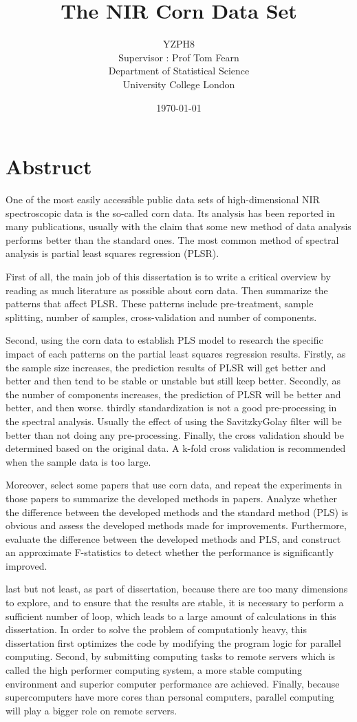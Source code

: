\documentclass[a4paper,12pt,titlepage]{article} %
\title{The NIR Corn Data Set}
\author{YZPH8 \vspace{2cm} \\
	Supervisor : Prof Tom Fearn \vspace{2cm} \\
	Department of Statistical Science \\
	University College London}
\date{\today} %
\numberwithin{equation}{section}  %
\begin{document}
	\maketitle         %
	
	\section{Abstruct} 
	
	One of the most easily accessible public data sets of high-dimensional NIR spectroscopic data is the so-called corn data. Its analysis has been reported in many publications, usually with the claim that some new method of data analysis performs better than the standard ones. The most common method of spectral analysis is partial least squares regression (PLSR). 
	
	First of all, the main job of this dissertation is to write a critical overview by reading as much literature as possible about corn data. Then summarize the patterns that affect PLSR. These patterns include pre-treatment, sample splitting,  number of samples, cross-validation and number of components. 
	
	Second, using the corn data to establish PLS model to research the specific impact of each patterns on the partial least squares regression results. Firstly, as the sample size increases, the prediction results of PLSR will get better and better and then tend to be stable or unstable but still keep better. Secondly, as the number of components increases, the prediction of PLSR will be better and better, and then worse. thirdly standardization is not a good pre-processing in the spectral analysis. Usually the effect of using the SavitzkyGolay filter will be better than not doing any pre-processing. Finally, the cross validation should be determined based on the original data. A k-fold cross validation is recommended when the sample data is too large.
	
	Moreover, select some papers that use corn data, and repeat the experiments in those papers to summarize the developed methods in papers. Analyze whether the difference between the developed methods and the standard method (PLS) is obvious and assess the developed methods made for improvements. Furthermore,  evaluate the difference between the developed methods and PLS, and construct an approximate F-statistics to detect whether the performance is significantly improved.
	
	last but not least, as part of dissertation, because there are too many dimensions to explore, and to ensure that the results are stable, it is necessary to perform a sufficient number of loop, which leads to a large amount of calculations in this dissertation. In order to solve the problem of computationly heavy, this dissertation first optimizes the code by modifying the program logic for parallel computing. Second, by submitting computing tasks to remote servers which is called the high performer computing system, a more stable computing environment and superior computer performance are achieved. Finally, because supercomputers have more cores than personal computers, parallel computing will play a bigger role on remote servers.
	\newpage           %
	
\end{document}
